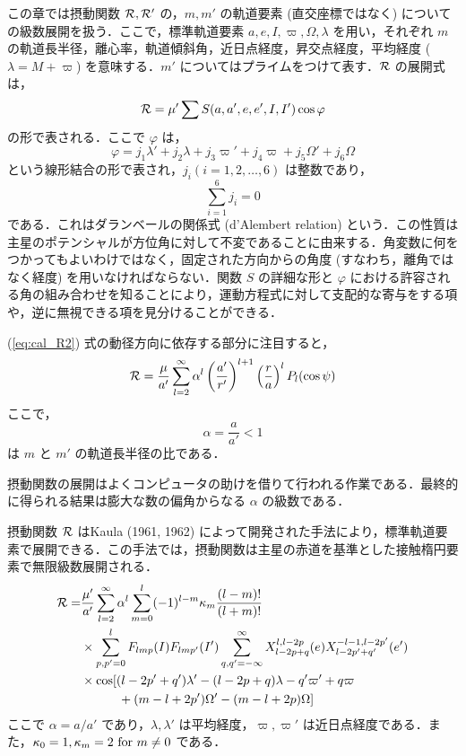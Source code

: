 \documentclass[11pt,a4paper,oneside,onecolumn]{jarticle}
\begin{document}
この章では摂動関数 ${\cal R}, {\cal R'}$ の，$m, m'$ の軌道要素 (直交座標ではなく) についての級数展開を扱う．ここで，標準軌道要素 $a, e, I, \varpi, \Omega, \lambda$ を用い，それぞれ $m$ の軌道長半径，離心率，軌道傾斜角，近日点経度，昇交点経度，平均経度 ($\lambda = M + \varpi$) を意味する．$m'$ についてはプライムをつけて表す．${\cal R}$ の展開式は，
\begin{equation}
{\cal R} = \mu' \sum S (a,a',e,e',I,I') \cos \varphi \label{eq:cal_R_varphi}
\end{equation}
の形で表される．ここで $\varphi$ は，
\begin{equation}
\varphi = j_1 \lambda' + j_2 \lambda + j_3 \varpi' + j_4 \varpi + j_5 \Omega' + j_6 \Omega \label{eq:varphi}
\end{equation}
という線形結合の形で表され，$j_i (i = 1,2,…,6)$ は整数であり，
\begin{equation}
\sum_{i = 1}^{6} j_i = 0
\end{equation}
である．これはダランベールの関係式 (d'Alembert relation) という．この性質は主星のポテンシャルが方位角に対して不変であることに由来する．角変数に何をつかってもよいわけではなく，固定された方向からの角度 (すなわち，離角ではなく経度) を用いなければならない．関数 $S$ の詳細な形と $\varphi$ における許容される角の組み合わせを知ることにより，運動方程式に対して支配的な寄与をする項や，逆に無視できる項を見分けることができる．

(\ref{eq:cal_R2}) 式の動径方向に依存する部分に注目すると，
\begin{equation}
{\cal R} = \frac{\mu}{a'} \sum_{l = 2}^{\infty} \alpha^l \left( \frac{a'}{r'} \right)^{l+1} \left( \frac{r}{a} \right)^l P_l (\cos \psi)
\end{equation}
ここで，
\begin{equation}
\alpha = \frac{a}{a'} < 1
\end{equation}
は $m$ と $m'$ の軌道長半径の比である．

摂動関数の展開はよくコンピュータの助けを借りて行われる作業である．最終的に得られる結果は膨大な数の偏角からなる $\alpha$ の級数である．

摂動関数 ${\cal R}$ はKaula (1961, 1962) によって開発された手法により，標準軌道要素で展開できる．この手法では，摂動関数は主星の赤道を基準とした接触楕円要素で無限級数展開される．
\begin{equation}
\begin{split}
{\cal R} = & \frac{\mu'}{a'} \sum_{l = 2}^{\infty} \alpha^l \sum_{m = 0}^l (-1)^{l - m} \kappa_m \frac{(l - m) !}{(l + m) !} \\
& \times \sum_{p,p' = 0}^l F_{lmp} (I) F_{lmp'} (I') \sum_{q,q' = - \infty}^{\infty} X_{l - 2p + q}^{l, l - 2p} (e) X_{l - 2p' + q'}^{-l -1, l - 2p'} (e') \\
& \times \cos [ (l - 2p' + q') \lambda' - (l - 2p + q) \lambda - q' \varpi' + q \varpi \\
& \quad \quad \quad+ (m - l + 2p') \Omega' - (m - l + 2p) \Omega ]
\end{split}
\end{equation}
ここで $\alpha = a / a'$ であり，$\lambda, \lambda'$ は平均経度，$\varpi, \varpi'$ は近日点経度である．また，$\kappa_0 = 1, \kappa_m = 2 \ {\rm for} \ m \not = 0$ である．
\end{document}
